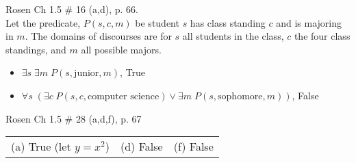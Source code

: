 \documentclass[10pt,addpoints]{exam}
\begin{document}
\begin{questions}
\question[4] Rosen Ch 1.5 \# 16 (a,d), p. 66. \\
Let the predicate, $P(s,c,m)$ be student $s$ has class standing $c$ and is majoring in $m$.  The domains of discourses are for $s$ all students in the class, $c$ the four class standings, and $m$ all possible majors.
	\ifprintanswers
        \vspace{-12pt}
    \fi
	\begin{solution}
	\begin{itemize}[itemsep=0pt,parsep=0pt,topsep=0pt,partopsep=0pt]
		\item[(a)] $\exists s\; \exists m\; P(s, \text{junior}, m)$, True
		\item[(d)] $\forall s\; (\exists c\; P(s,c, \text{computer science}) \vee \exists m\; P(s, \text{sophomore}, m))$, False
	\end{itemize}
	\end{solution}



\question[3] Rosen Ch 1.5 \# 28 (a,d,f), p. 67
    \ifprintanswers
        \vspace{-12pt}
    \fi
\begin{solution}
    \begin{tabular}{lll}
    	(a) True (let $y=x^2$) & (d) False & (f) False 
    \end{tabular}
\end{solution}




\end{questions}
\end{document}
